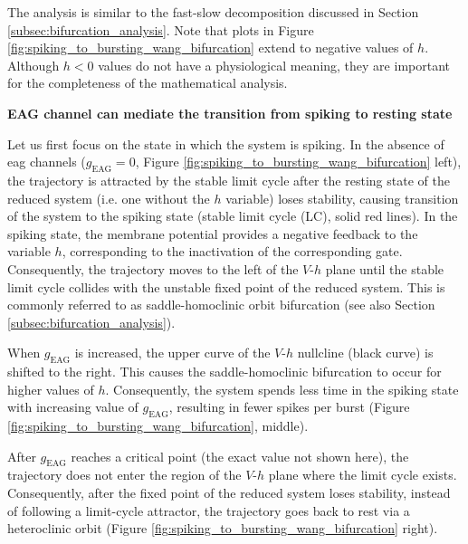 \documentclass[../main.tex]{subfiles}
\begin{document}
The analysis is similar to the fast-slow decomposition discussed in Section \ref{subsec:bifurcation_analysis}. Note that plots in Figure \ref{fig:spiking_to_bursting_wang_bifurcation} extend to negative values of $h$. Although $h<0$ values do not have a physiological meaning, they are important for the completeness of the mathematical analysis.

\vspace*{0.3cm}
\noindent\textbf{EAG channel can mediate the transition from spiking to resting state}

Let us first focus on the state in which the system is spiking.
In the absence of \gls{eag} channels ($g_{\text{EAG}}=0$, Figure \ref{fig:spiking_to_bursting_wang_bifurcation} left), the trajectory is attracted by the stable limit cycle after the resting state of the reduced system (i.e. one without the $h$ variable) loses stability, causing transition of the system to the spiking state (stable limit cycle (LC), solid red lines). In the spiking state, the membrane potential provides a negative feedback to the variable $h$, corresponding to the inactivation of the corresponding gate. Consequently, the trajectory moves to the left of the $V$-$h$ plane until the stable limit cycle collides with the unstable fixed point of the reduced system. This is commonly referred to as saddle-homoclinic orbit bifurcation \parencite{izhikevichDynamicalSystemsNeuroscience2006,izhikevichNEURALEXCITABILITYSPIKING2000} (see also Section \ref{subsec:bifurcation_analysis}).

When $g_{\text{EAG}}$ is increased, the upper curve of the $V$-$h$ nullcline (black curve) is shifted to the right. This causes the saddle-homoclinic bifurcation to occur for higher values of $h$. Consequently, the system spends less time in the spiking state with increasing value of $g_{\text{EAG}}$, resulting in fewer spikes per burst (Figure \ref{fig:spiking_to_bursting_wang_bifurcation}, middle).

After $g_{\text{EAG}}$ reaches a critical point (the exact value not shown here), the trajectory does not enter the region of the $V$-$h$ plane where the limit cycle exists. Consequently, after the fixed point of the reduced system loses stability, instead of following a limit-cycle attractor, the trajectory goes back to rest via a heteroclinic orbit (Figure \ref{fig:spiking_to_bursting_wang_bifurcation} right).
\end{document}
